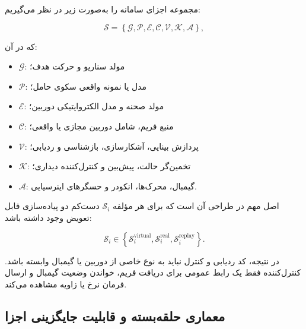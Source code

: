 \documentclass[12pt,a4paper]{article}
\begin{document}
مجموعه اجزای سامانه را به‌صورت زیر در نظر می‌گیریم:

\begin{equation}
	\mathcal{S}
	=
	\left\{
	\mathcal{G},
	\mathcal{P},
	\mathcal{E},
	\mathcal{C},
	\mathcal{V},
	\mathcal{K},
	\mathcal{A}
	\right\},
	\label{eq:hil_component_set}
\end{equation}

که در آن:

\begin{itemize}
	\item
	\(\mathcal{G}\):
	مولد سناریو و حرکت هدف؛
	
	\item
	\(\mathcal{P}\):
	مدل یا نمونه واقعی سکوی حامل؛
	
	\item
	\(\mathcal{E}\):
	مولد صحنه و مدل الکترواپتیکی دوربین؛
	
	\item
	\(\mathcal{C}\):
	منبع فریم، شامل دوربین مجازی یا واقعی؛
	
	\item
	\(\mathcal{V}\):
	پردازش بینایی، آشکارسازی، بازشناسی و ردیابی؛
	
	\item
	\(\mathcal{K}\):
	تخمین‌گر حالت، پیش‌بین و کنترل‌کننده دیداری؛
	
	\item
	\(\mathcal{A}\):
	گیمبال، محرک‌ها، انکودر و حسگرهای اینرسیایی.
\end{itemize}

اصل مهم در طراحی آن است که برای هر مؤلفه
\(\mathcal{S}_{i}\)
دست‌کم دو پیاده‌سازی قابل تعویض وجود داشته باشد:

\begin{equation}
	\mathcal{S}_{i}
	\in
	\left\{
	\mathcal{S}_{i}^{\mathrm{virtual}},
	\mathcal{S}_{i}^{\mathrm{real}},
	\mathcal{S}_{i}^{\mathrm{replay}}
	\right\}.
	\label{eq:replaceable_modules}
\end{equation}

در نتیجه، کد ردیابی و کنترل نباید به نوع خاصی از دوربین یا
گیمبال وابسته باشد. کنترل‌کننده فقط یک رابط عمومی برای دریافت
فریم، خواندن وضعیت گیمبال و ارسال فرمان نرخ یا زاویه مشاهده
می‌کند.

\subsection{معماری حلقه‌بسته و قابلیت جایگزینی اجزا}
\label{subsec:hil_modular_architecture}
\end{document}
